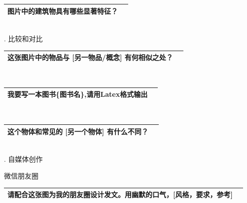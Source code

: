 \documentclass[12pt]{book}
\begin{document}
\begin{tabular}{|p{15cm}|p{3cm}|}
	\hline
图片中的建筑物具有哪些显著特征？\\
	\hline
\end{tabular}\\



. 比较和对比

\begin{tabular}{|p{15cm}|p{3cm}|}
	\hline
这张图片中的物品与 [另一物品/概念] 有何相似之处？\\
	\hline
\end{tabular}\\




\begin{tabular}{|p{15cm}|p{3cm}|}
	\hline
	我要写一本图书\{图书名\},请用Latex格式输出\\
	\hline
\end{tabular}\\



\begin{tabular}{|p{15cm}|p{3cm}|}
	\hline
这个物体和常见的 [另一个物体] 有什么不同？\\
	\hline
\end{tabular}\\


. 自媒体创作

\bigskip
微信朋友圈


\begin{tabular}{|p{15cm}|p{3cm}|}
	\hline
请配合这张图为我的朋友圈设计发文。用幽默的口气，[风格，要求，参考]\\
	\hline
\end{tabular}\\
\end{document}
